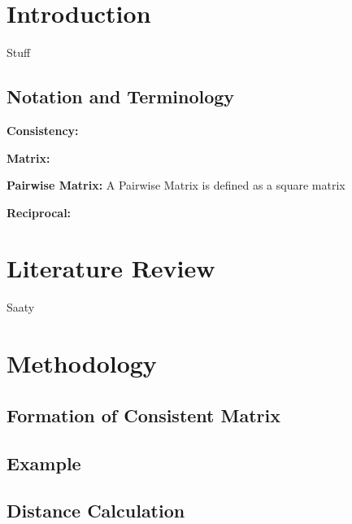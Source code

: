 \documentclass[12pt]{amsart}
\newtheorem{theorem}{Theorem}
\theoremstyle{definition}
\begin{document}
\newpage
\tableofcontents
\newpage
\newpage



\section{Introduction}

Stuff

\subsection{Notation and Terminology}
{\bf Consistency:}

{\bf Matrix:}

{\bf Pairwise Matrix:} A Pairwise Matrix is defined as a square matrix

{\bf Reciprocal:}

\section{Literature Review}
%
Saaty

\section{Methodology}

\subsection{Formation of Consistent Matrix}

\subsection{Example}

\subsection{Distance Calculation}
%
%    
%
\end{document}
